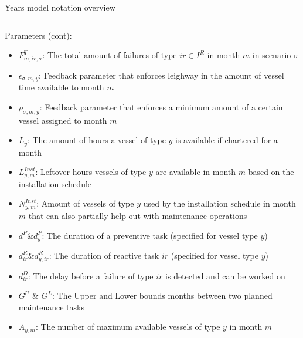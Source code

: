 \documentclass{beamer}
\begin{document}
\begin{frame}{Years model notation overview}
\begin{columns}
\begin{column}{.48\textwidth}
Parameters (cont):
\begin{itemize}
\item $F^T_{m,ir,\sigma}$: The total amount of failures of type $ir \in I^R$ in month $m$ in scenario $\sigma$
\item $\epsilon_{\sigma, m, y}$: Feedback parameter that enforces leighway in the amount of vessel time available to month $m$
\item $\rho_{ \sigma, m, y}$: Feedback parameter that enforces a minimum amount of a certain vessel assigned to month $m$
\item $L_y$: The amount of hours a vessel of type $y$ is available if chartered for a month
\item $L^{Inst}_{y,m}$: Leftover hours vessels of type $y$ are available in month $m$ based on the installation schedule
\item $N^{Inst}_{y,m}$: Amount of vessels of type $y$ used by the installation schedule in month $m$ that can also partially help out with maintenance operations
\item $d^P \& d^P_y$: The duration of a preventive task (specified for vessel type $y$)
\item $d^R_{ir} \& d^R_{y,ir}$: The duration of reactive task $ir$ (specified for vessel type $y$)
\item $d^D_{ir}$: The delay before a failure of type $ir$ is detected and can be worked on
\item $G^U$ \& $G^L$: The Upper and Lower bounds months between two planned maintenance tasks
\item $A_{y,m}$: The number of maximum available vessels of type $y$ in month $m$
\end{itemize}
\end{column}
\end{columns}
\end{frame}

\end{document}

